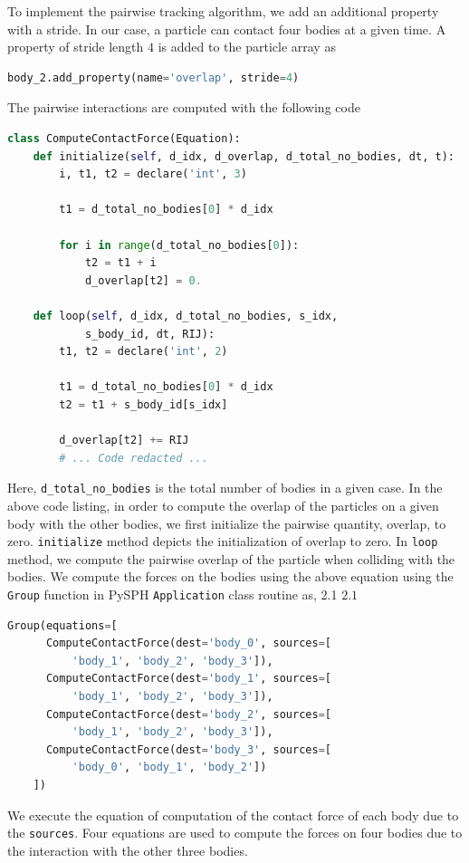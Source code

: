 To implement the pairwise tracking algorithm, we add an additional property with
a stride. In our case, a particle can contact four bodies at a given time. A
property of stride length $4$ is added to the particle array as
 \lstset{basicstyle=\footnotesize\ttfamily}
\begin{lstlisting}[label={contact:equations},frame=lines,language=Python,upquote=True]
body_2.add_property(name='overlap', stride=4)
\end{lstlisting}
The pairwise interactions are computed with the following code
 \lstset{basicstyle=\footnotesize\ttfamily}
\begin{lstlisting}[label={contact:equations},frame=lines,language=Python,upquote=True]
class ComputeContactForce(Equation):
    def initialize(self, d_idx, d_overlap, d_total_no_bodies, dt, t):
        i, t1, t2 = declare('int', 3)

        t1 = d_total_no_bodies[0] * d_idx

        for i in range(d_total_no_bodies[0]):
            t2 = t1 + i
            d_overlap[t2] = 0.

    def loop(self, d_idx, d_total_no_bodies, s_idx,
            s_body_id, dt, RIJ):
        t1, t2 = declare('int', 2)

        t1 = d_total_no_bodies[0] * d_idx
        t2 = t1 + s_body_id[s_idx]

        d_overlap[t2] += RIJ
        # ... Code redacted ...
\end{lstlisting}
Here, \texttt{d\_total\_no\_bodies} is the total number of bodies in a given
case. In the above code listing, in order to compute the overlap of the
particles on a given body with the other bodies, we first initialize the
pairwise quantity, overlap, to zero. \texttt{initialize} method depicts the
initialization of overlap to zero. In \texttt{loop} method, we compute the pairwise
overlap of the particle when colliding with the bodies. We compute the forces on
the bodies using the above equation using the \texttt{Group} function in PySPH
\texttt{Application} class routine as, 2.1 $2.1$
 \lstset{basicstyle=\footnotesize\ttfamily}
\begin{lstlisting}[label={contact:equations},frame=lines,language=Python,upquote=True]
  Group(equations=[
      ComputeContactForce(dest='body_0', sources=[
          'body_1', 'body_2', 'body_3']),
      ComputeContactForce(dest='body_1', sources=[
          'body_1', 'body_2', 'body_3']),
      ComputeContactForce(dest='body_2', sources=[
          'body_1', 'body_2', 'body_3']),
      ComputeContactForce(dest='body_3', sources=[
          'body_0', 'body_1', 'body_2'])
    ])
\end{lstlisting}
We execute the equation of computation of the contact force of each body due to the
\texttt{sources}. Four equations are used to compute the forces on four bodies due to
the interaction with the other three bodies.


